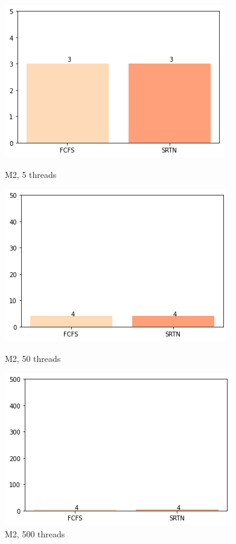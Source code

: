 \documentclass{beamer}
\begin{document}
\begin{frame}
\blindtext



\blindtext

\begin{figure}[!htb]
  \includegraphics[width=\linewidth]{imgs/deadline5-2.png}
  \caption{M2, 5 threads}\label{fig:awesome_image1}
\endminipage\hfill
{}
  \includegraphics[width=\linewidth]{imgs/deadline50-2.png}
  \caption{M2, 50 threads}\label{fig:awesome_image2}
\endminipage\hfill
{}%
  \includegraphics[width=\linewidth]{imgs/deadline500-2.png}
  \caption{M2, 500 threads}\label{fig:awesome_image3}
\endminipage
\end{figure}


\end{frame}
\end{document}
